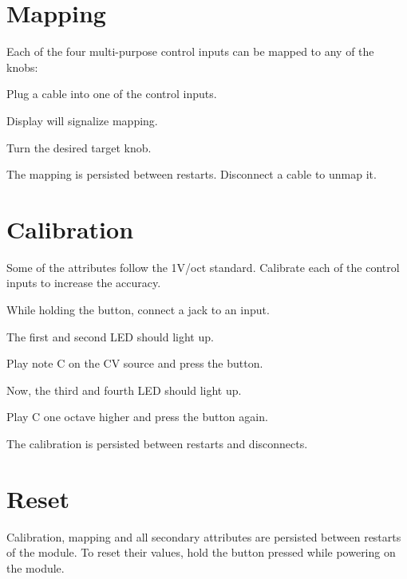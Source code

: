 \documentclass[11pt]{article}
\newenvironment{packed_enumerate}{
\begin{enumerate}
  \setlength{\itemsep}{1pt}
  \setlength{\parskip}{0pt}
  \setlength{\parsep}{0pt}
}{\end{enumerate}}
\begin{document}
\begin{minipage}[t]{0.35\textwidth}
\setlength{\parskip}{6pt}

\section{Mapping}

Each of the four multi-purpose control inputs can be mapped to any of the knobs:

\begin{packed_enumerate}
  \item Plug a cable into one of the control inputs.
  \item Display will signalize mapping.
  \item Turn the desired target knob.
\end{packed_enumerate}

The mapping is persisted between restarts. Disconnect a cable to unmap it.

\vspace{1.3cm}

\section{Calibration}

Some of the attributes follow the 1V/oct standard. Calibrate each of the control
inputs to increase the accuracy.

\begin{packed_enumerate}
  \item While holding the button, connect a jack to an input.
  \item The first and second LED should light up.
  \item Play note C on the CV source and press the button.
  \item Now, the third and fourth LED should light up.
  \item Play C one octave higher and press the button again.
\end{packed_enumerate}

The calibration is persisted between restarts and disconnects.

\vspace{1.3cm}

\section{Reset}

Calibration, mapping and all secondary attributes are persisted between restarts
of the module. To reset their values, hold the button pressed while powering on
the module.

\end{minipage}
\end{document}
